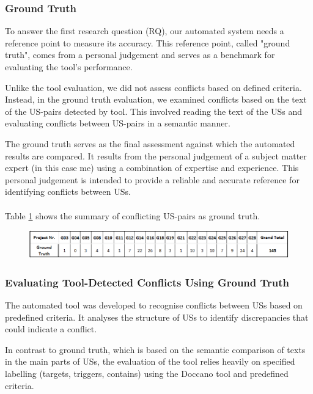 \subsubsection*{Ground Truth}
To answer the first research question (RQ), our automated system needs a reference point to measure its accuracy. This reference point, called "ground truth", comes from a personal judgement and serves as a benchmark for evaluating the tool's performance.

Unlike the tool evaluation, we did not assess conflicts based on defined criteria. Instead, in the ground truth evaluation, we examined conflicts based on the text of the US-pairs detected by tool. This involved reading the text of the USs and evaluating conflicts between US-pairs in a semantic manner.

The ground truth serves as the final assessment against which the automated results are compared. It results from the personal judgement of a subject matter expert (in this case me) using a combination of expertise and experience. This personal judgement is intended to provide a reliable and accurate reference for identifying conflicts between USs.\\\\
Table \ref{tb:conflict_ground_truth} shows the summary of conflicting US-pairs as ground truth.
\begin{figure}[h]
	\begingroup
	\scriptsize
	\centering
	\includegraphics[scale=0.6]{Table/conflict_ground_truth.png}
	\label{tb:conflict_ground_truth}	
	\endgroup
\end{figure}
\subsubsection*{Evaluating Tool-Detected Conflicts Using Ground Truth}
The automated tool was developed to recognise conflicts between USs based on predefined criteria. It analyses the structure of USs to identify discrepancies that could indicate a conflict.

In contrast to ground truth, which is based on the semantic comparison of texts in the main parts of USs, the evaluation of the tool relies heavily on specified labelling (targets, triggers, contains) using the Doccano tool and predefined criteria.

